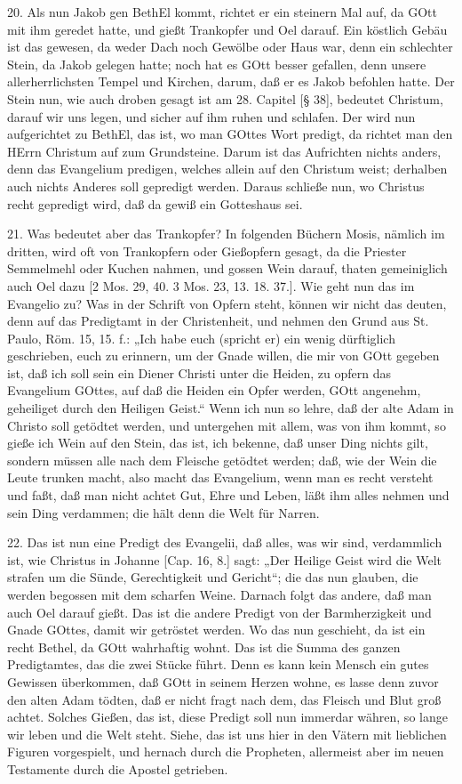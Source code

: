 20. Als nun Jakob gen BethEl kommt, richtet er ein steinern Mal auf, da GOtt mit ihm geredet hatte, und gießt Trankopfer und Oel darauf. Ein köstlich Gebäu ist das gewesen, da weder Dach noch Gewölbe oder Haus war, denn ein schlechter Stein, da Jakob gelegen hatte; noch hat es GOtt besser gefallen, denn unsere allerherrlichsten Tempel und Kirchen, darum, daß er es Jakob befohlen hatte. Der Stein nun, wie auch droben gesagt ist am 28. Capitel [§ 38], bedeutet Christum, darauf wir uns legen, und sicher auf ihm ruhen und schlafen. Der wird nun aufgerichtet zu BethEl, das ist, wo man GOttes Wort predigt, da richtet man den HErrn Christum auf zum Grundsteine. Darum ist das Aufrichten nichts anders, denn das Evangelium predigen, welches allein auf den Christum weist; derhalben auch nichts Anderes soll gepredigt werden. Daraus schließe nun, wo Christus recht gepredigt wird, daß da gewiß ein Gotteshaus sei.

21. Was bedeutet aber das Trankopfer? In folgenden Büchern Mosis, nämlich im dritten, wird oft von Trankopfern oder Gießopfern gesagt, da die Priester Semmelmehl oder Kuchen nahmen, und gossen Wein darauf, thaten gemeiniglich auch Oel dazu [2 Mos. 29, 40. 3 Mos. 23, 13. 18. 37.]. Wie geht nun das im Evangelio zu? Was in der Schrift von Opfern steht, können wir nicht das deuten, denn auf das Predigtamt in der Christenheit, und nehmen den Grund aus St. Paulo, Röm. 15, 15. f.: „Ich habe euch (spricht er) ein wenig dürftiglich geschrieben, euch zu erinnern, um der Gnade willen, die mir von GOtt gegeben ist, daß ich soll sein ein Diener Christi unter die Heiden, zu opfern das Evangelium GOttes, auf daß die Heiden ein Opfer werden, GOtt angenehm, geheiliget durch den Heiligen Geist.“ Wenn ich nun so lehre, daß der alte Adam in Christo soll getödtet werden, und untergehen mit allem, was von ihm kommt, so gieße ich Wein auf den Stein, das ist, ich bekenne, daß unser Ding nichts gilt, sondern müssen alle nach dem Fleische getödtet werden; daß, wie der Wein die Leute trunken macht, also macht das Evangelium, wenn man es recht versteht und faßt, daß man nicht achtet Gut, Ehre und Leben, läßt ihm alles nehmen und sein Ding verdammen; die hält denn die Welt für Narren.

22. Das ist nun eine Predigt des Evangelii, daß alles, was wir sind, verdammlich ist, wie Christus in Johanne [Cap. 16, 8.] sagt: „Der Heilige Geist wird die Welt strafen um die Sünde, Gerechtigkeit und Gericht“; die das nun glauben, die werden begossen mit dem scharfen Weine. Darnach folgt das andere, daß man auch Oel darauf gießt. Das ist die andere Predigt von der Barmherzigkeit und Gnade GOttes, damit wir getröstet werden. Wo das nun geschieht, da ist ein recht Bethel, da GOtt wahrhaftig wohnt. Das ist die Summa des ganzen Predigtamtes, das die zwei Stücke führt. Denn es kann kein Mensch ein gutes Gewissen überkommen, daß GOtt in seinem Herzen wohne, es lasse denn zuvor den alten Adam tödten, daß er nicht fragt nach dem, das Fleisch und Blut groß achtet. Solches Gießen, das ist, diese Predigt soll nun immerdar währen, so lange wir leben und die Welt steht. Siehe, das ist uns hier in den Vätern mit lieblichen Figuren vorgespielt, und hernach durch die Propheten, allermeist aber im neuen Testamente durch die Apostel getrieben.

